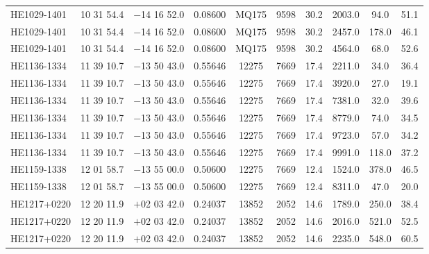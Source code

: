 \begin{landscape}
\begin{center}
\begin{longtable}{l c c c c c c c c c}
HE1029-1401  &             10 31 54.4  &         $-$14 16 52.0  &       0.08600  & MQ175  &   9598  &       30.2  &      2003.0  &  94.0  &   51.1  \\
HE1029-1401  &             10 31 54.4  &         $-$14 16 52.0  &       0.08600  & MQ175  &   9598  &       30.2  &      2457.0  &  178.0  &  46.1  \\
HE1029-1401  &             10 31 54.4  &         $-$14 16 52.0  &       0.08600  & MQ175  &   9598  &       30.2  &      4564.0  &  68.0  &   52.6  \\
HE1136-1334  &             11 39 10.7  &         $-$13 50 43.0  &       0.55646  & 12275  &   7669  &       17.4  &      2211.0  &  34.0  &   36.4  \\
HE1136-1334  &             11 39 10.7  &         $-$13 50 43.0  &       0.55646  & 12275  &   7669  &       17.4  &      3920.0  &  27.0  &   19.1  \\
HE1136-1334  &             11 39 10.7  &         $-$13 50 43.0  &       0.55646  & 12275  &   7669  &       17.4  &      7381.0  &  32.0  &   39.6  \\
HE1136-1334  &             11 39 10.7  &         $-$13 50 43.0  &       0.55646  & 12275  &   7669  &       17.4  &      8779.0  &  74.0  &   34.5  \\
HE1136-1334  &             11 39 10.7  &         $-$13 50 43.0  &       0.55646  & 12275  &   7669  &       17.4  &      9723.0  &  57.0  &   34.2  \\
HE1136-1334  &             11 39 10.7  &         $-$13 50 43.0  &       0.55646  & 12275  &   7669  &       17.4  &      9991.0  &  118.0  &  37.2  \\
HE1159-1338  &             12 01 58.7  &         $-$13 55 00.0  &       0.50600  & 12275  &   7669  &       12.4  &      1524.0  &  378.0  &  46.5  \\
HE1159-1338  &             12 01 58.7  &         $-$13 55 00.0  &       0.50600  & 12275  &   7669  &       12.4  &      8311.0  &  47.0  &   20.0  \\
HE1217+0220  &             12 20 11.9  &         $+$02 03 42.0  &       0.24037  & 13852  &   2052  &       14.6  &      1789.0  &  250.0  &  38.4  \\
HE1217+0220  &             12 20 11.9  &         $+$02 03 42.0  &       0.24037  & 13852  &   2052  &       14.6  &      2016.0  &  521.0  &  52.5  \\
HE1217+0220  &             12 20 11.9  &         $+$02 03 42.0  &       0.24037  & 13852  &   2052  &       14.6  &      2235.0  &  548.0  &  60.5  \\

\end{longtable}
\end{center}
\end{landscape}
